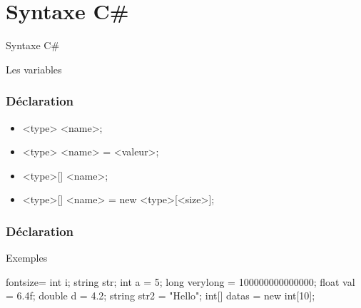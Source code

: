 \section{Syntaxe C\#}

\begingroup
{}
\begin{frame}
    \begin{center}
        \vspace{1cm}
        {\Large\color{background}
            Syntaxe C\#
        }
    \end{center}
\end{frame}
\endgroup

\begin{frame}
  \begin{center}
    \vspace{1cm}
    Les variables
  \end{center}
\end{frame}

\begin{frame}[c]
  \frametitle{Déclaration}

  \begin{center}
    \begin{itemize}
      \item<+-> <type> <name>;
      \item<+-> <type> <name> = <valeur>;
      \item<+-> <type>[] <name>;
      \item<+-> <type>[] <name> = new <type>[<size>];
    \end{itemize}
  \end{center}
\end{frame}

\begin{frame}[fragile]
  \frametitle{Déclaration}

  \begin{center}{\large Exemples}\end{center}
    \begin{csharpcode*}{fontsize=\scriptsize}
      int i;
      string str;
      int a = 5;
      long verylong = 100000000000000;
      float val = 6.4f;
      double d = 4.2;
      string str2 = "Hello";
      int[] datas = new int[10];
    \end{csharpcode*}
  \end{frame}

